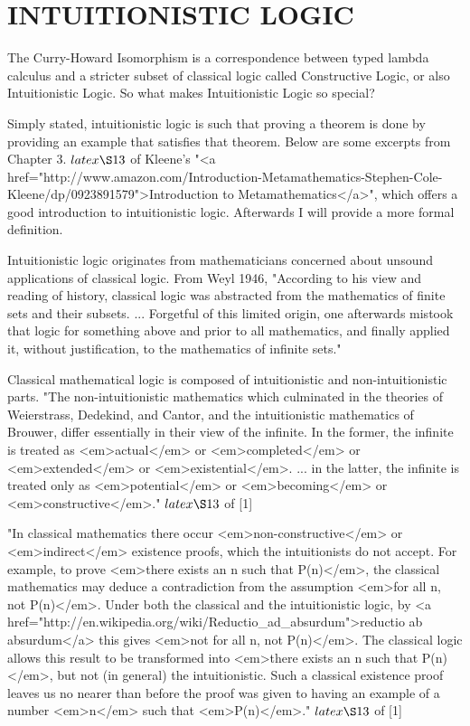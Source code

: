 %
%
\chapter{INTUITIONISTIC LOGIC}\label{ch:logic}
The Curry-Howard Isomorphism is a correspondence between typed lambda calculus and a stricter subset of classical logic called Constructive Logic, or also Intuitionistic Logic. So what makes Intuitionistic Logic so special?

Simply stated, intuitionistic logic is such that proving a theorem is done by providing an example that satisfies that theorem. Below are some excerpts from Chapter 3. $latex \S 13$ of Kleene's "<a href="http://www.amazon.com/Introduction-Metamathematics-Stephen-Cole-Kleene/dp/0923891579">Introduction to Metamathematics</a>", which offers a good introduction to intuitionistic logic. Afterwards I will provide a more formal definition.

Intuitionistic logic originates from mathematicians concerned about unsound applications of classical logic. From Weyl 1946, "According to his view and reading of history, classical logic was abstracted from the mathematics of finite sets and their subsets. ... Forgetful of this limited origin, one afterwards mistook that logic for something above and prior to all mathematics, and finally applied it, without justification, to the mathematics of infinite sets."

Classical mathematical logic is composed of intuitionistic and non-intuitionistic parts. "The non-intuitionistic mathematics which culminated in the theories of Weierstrass, Dedekind, and Cantor, and the intuitionistic mathematics of Brouwer, differ essentially in their view of the infinite. In the former, the infinite is treated as <em>actual</em> or <em>completed</em> or <em>extended</em> or <em>existential</em>. ... in the latter, the infinite is treated only as <em>potential</em> or <em>becoming</em> or <em>constructive</em>." $latex \S 13$ of [1]

"In classical mathematics there occur <em>non-constructive</em> or <em>indirect</em> existence proofs, which the intuitionists do not accept. For example, to prove <em>there exists an n such that P(n)</em>, the classical mathematics may deduce a contradiction from the assumption <em>for all n, not P(n)</em>. Under both the classical and the intuitionistic logic, by <a href="http://en.wikipedia.org/wiki/Reductio_ad_absurdum">reductio ab absurdum</a> this gives <em>not for all n, not P(n)</em>. The classical logic allows this result to be transformed into <em>there exists an n such that P(n)</em>, but not (in general) the intuitionistic. Such a classical existence proof leaves us no nearer than before the proof was given to having an example of a number <em>n</em> such that <em>P(n)</em>." $latex \S 13$ of [1]

